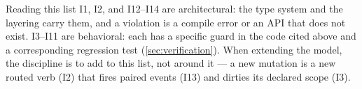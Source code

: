 \begin{qrcallout}{Reading this list}
I1, I2, and I12--I14 are architectural: the type system and the layering carry them, and
a violation is a compile error or an API that does not exist. I3--I11 are behavioral:
each has a specific guard in the code cited above and a corresponding regression test
(\cref{sec:verification}). When extending the model, the discipline is to add to this
list, not around it --- a new mutation is a new routed verb (I2) that fires paired
events (I13) and dirties its declared scope (I3).
\end{qrcallout}
